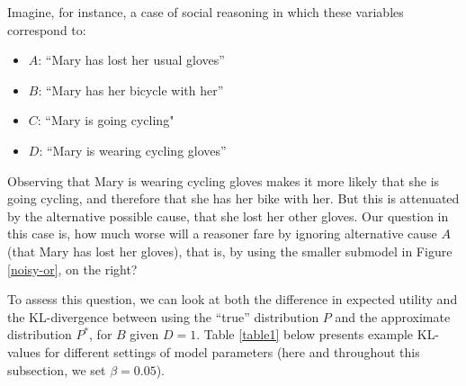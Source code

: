 \documentclass[10pt,letterpaper]{article}
\begin{document}
\noindent Imagine, for instance, a case of social reasoning in which these variables correspond to: 
\begin{itemize} 
  \setlength\itemsep{1pt}
\item[] $A$: ``Mary has lost her usual gloves'' \item[] $B$: ``Mary has her bicycle with her''  \item[] $C$: ``Mary is going cycling"  \item[] $D$:  ``Mary is wearing cycling gloves'' \end{itemize}
Observing that Mary is wearing cycling gloves makes it more likely that she is going cycling, and therefore that she has her bike with her. But this is attenuated by the alternative possible cause, that she lost her other gloves. Our question in this case is, how much worse will a reasoner fare by ignoring alternative cause $A$ (that Mary has lost her gloves), that is, by using the smaller submodel  in Figure \ref{noisy-or}, on the right?

To assess this question, we can look at both the difference in expected utility and the KL-divergence between using the ``true'' distribution $P$ and the approximate distribution $P^*$, for $B$ given $D=1$. Table \ref{table1} below presents example KL-values for different settings of model parameters (here and throughout this subsection, we set $\beta = 0.05$).
\end{document}
